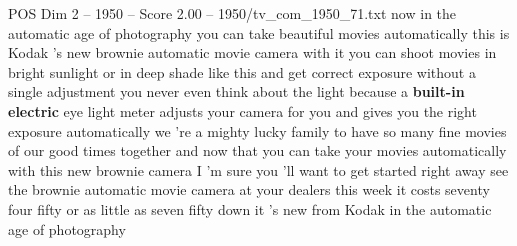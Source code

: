 \begin{textsample}{POS Dim 2 – 1950 – Score 2.00 – 1950/tv\_com\_1950\_71.txt}  \label{ex:f2_pos_014}
now in the automatic age of photography you can take beautiful movies automatically this is Kodak 's new brownie automatic movie camera with it you can shoot movies in bright sunlight or in deep shade like this and get correct exposure without a single adjustment you never even think about the light because a \textbf{built-in} \textbf{electric} eye light meter adjusts your camera for you and gives you the right exposure automatically we 're a mighty lucky family to have so many fine movies of our good times together and now that you can take your movies automatically with this new brownie camera I 'm sure you 'll want to get started right away see the brownie automatic movie camera at your dealers this week it costs seventy four fifty or as little as seven fifty down it 's new from Kodak in the automatic age of photography

\end{textsample}
